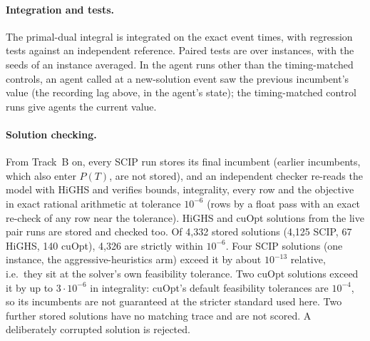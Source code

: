 \paragraph{Integration and tests.} The primal-dual integral is integrated on the exact event times, with regression
tests against an independent reference. Paired tests are over instances, with the seeds of an instance averaged. In the
agent runs other than the timing-matched controls, an agent called at a new-solution event saw the previous incumbent's
value (the recording lag above, in the agent's state); the timing-matched control runs give agents the current value.

\paragraph{Solution checking.} From Track~B on, every SCIP run stores its final incumbent (earlier incumbents, which also
enter $P(T)$, are not stored), and an independent checker
re-reads the model with HiGHS and verifies bounds, integrality, every row and the objective in exact rational
arithmetic at tolerance $10^{-6}$ (rows by a float pass with an exact re-check of any row near the tolerance). HiGHS and cuOpt
solutions from the live pair runs are stored and checked too. Of 4{,}332 stored solutions (4{,}125 SCIP, 67 HiGHS, 140
cuOpt), 4{,}326 are strictly within $10^{-6}$. Four SCIP solutions (one instance, the aggressive-heuristics arm) exceed it
by about $10^{-13}$ relative, i.e.\ they sit at the solver's own feasibility tolerance. Two cuOpt solutions exceed it by
up to $3\cdot10^{-6}$ in integrality: cuOpt's default feasibility tolerances are $10^{-4}$, so its incumbents are not
guaranteed at the stricter standard used here. Two further stored solutions have no matching trace and are not scored. A deliberately corrupted solution is rejected.

